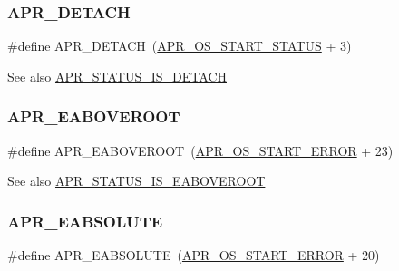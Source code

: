 \subsubsection{\texorpdfstring{A\+P\+R\+\_\+\+D\+E\+T\+A\+CH}{APR\_DETACH}}
{\footnotesize\ttfamily \#define A\+P\+R\+\_\+\+D\+E\+T\+A\+CH~(\mbox{\hyperlink{group__apr__errno_ga450e1a5734732e092ddaa5b67414f69b}{A\+P\+R\+\_\+\+O\+S\+\_\+\+S\+T\+A\+R\+T\+\_\+\+S\+T\+A\+T\+US}} + 3)}

\begin{DoxySeeAlso}{See also}
\mbox{\hyperlink{group___a_p_r___s_t_a_t_u_s___i_s_ga64d5d0a6bfe141a387dfdd430a38465b}{A\+P\+R\+\_\+\+S\+T\+A\+T\+U\+S\+\_\+\+I\+S\+\_\+\+D\+E\+T\+A\+CH}} 
\end{DoxySeeAlso}
\mbox{\label{group___a_p_r___error_ga4828cc04f97dc7bed691456adf7c073e}} 
\subsubsection{\texorpdfstring{A\+P\+R\+\_\+\+E\+A\+B\+O\+V\+E\+R\+O\+OT}{APR\_EABOVEROOT}}
{\footnotesize\ttfamily \#define A\+P\+R\+\_\+\+E\+A\+B\+O\+V\+E\+R\+O\+OT~(\mbox{\hyperlink{group__apr__errno_ga191894048b7bd0cca3cf0bdff1eb695b}{A\+P\+R\+\_\+\+O\+S\+\_\+\+S\+T\+A\+R\+T\+\_\+\+E\+R\+R\+OR}} + 23)}

\begin{DoxySeeAlso}{See also}
\mbox{\hyperlink{group___a_p_r___s_t_a_t_u_s___i_s_gae89b8de1e40b855cf95987ce5947b442}{A\+P\+R\+\_\+\+S\+T\+A\+T\+U\+S\+\_\+\+I\+S\+\_\+\+E\+A\+B\+O\+V\+E\+R\+O\+OT}} 
\end{DoxySeeAlso}
\mbox{\label{group___a_p_r___error_gafd1ffc5bf2bf215ad048780408913d0e}} 
\subsubsection{\texorpdfstring{A\+P\+R\+\_\+\+E\+A\+B\+S\+O\+L\+U\+TE}{APR\_EABSOLUTE}}
{\footnotesize\ttfamily \#define A\+P\+R\+\_\+\+E\+A\+B\+S\+O\+L\+U\+TE~(\mbox{\hyperlink{group__apr__errno_ga191894048b7bd0cca3cf0bdff1eb695b}{A\+P\+R\+\_\+\+O\+S\+\_\+\+S\+T\+A\+R\+T\+\_\+\+E\+R\+R\+OR}} + 20)}

